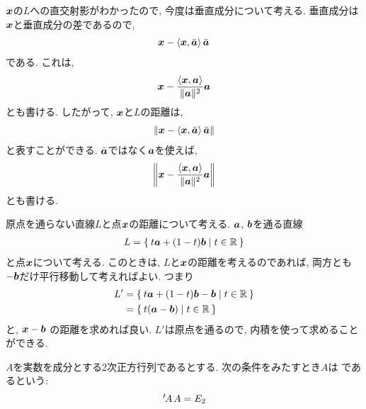 $\boldsymbol{x}$の$L$への直交射影がわかったので,
今度は垂直成分について考える.
垂直成分は$\boldsymbol{x}$と垂直成分の差であるので,
\begin{align*}
\boldsymbol{x}-\Braket{\boldsymbol{x},\bar{\boldsymbol{a}}}\bar{\boldsymbol{a}}
\end{align*}
である.
これは,
\begin{align*}
\boldsymbol{x}-\frac{\Braket{\boldsymbol{x},\boldsymbol{a}}}{\|\boldsymbol{a}\|^2}\boldsymbol{a}
\end{align*}
とも書ける.
したがって, $\boldsymbol{x}$と$L$の距離は,
\begin{align*}
\|\boldsymbol{x}-\Braket{\boldsymbol{x},\bar{\boldsymbol{a}}}\bar{\boldsymbol{a}}\|
\end{align*}
と表すことができる.
$\bar{\boldsymbol{a}}$ではなく$\boldsymbol{a}$を使えば,
\begin{align*}
\left\|\boldsymbol{x}-\frac{\Braket{\boldsymbol{x},\boldsymbol{a}}}{\|\boldsymbol{a}\|^2}\boldsymbol{a}\right\|
\end{align*}
とも書ける.



  原点を通らない直線$L$と点$\boldsymbol{x}$の距離について考える.
  $\boldsymbol{a}$, $\boldsymbol{b}$を通る直線
  \begin{align*}
    L=\Set{t\boldsymbol{a}+(1-t)\boldsymbol{b}|t\in \mathbb{R}}
  \end{align*}
  と点$\boldsymbol{x}$について考える.
  このときは, $L$と$\boldsymbol{x}$の距離を考えるのであれば,
  両方とも$-\boldsymbol{b}$だけ平行移動して考えればよい.
  つまり
  \begin{align*}
    L'&=\Set{t\boldsymbol{a}+(1-t)\boldsymbol{b}-\boldsymbol{b}|t\in \mathbb{R}}\\
    &=\Set{t(\boldsymbol{a}-\boldsymbol{b})|t\in \mathbb{R}}
  \end{align*}
  と, $\boldsymbol{x}-\boldsymbol{b}$
  の距離を求めれば良い.
  $L'$は原点を通るので,
  内積を使って求めることができる.
  

\begin{definition}
  \label{def:orthogonalmat}
  $A$を実数を成分とする2次正方行列であるとする.
  次の条件をみたすとき$A$は
  であるという:
  \begin{align*}
    {\left.^{t}\!A\right.}A=E_2
  \end{align*}
\end{definition}

